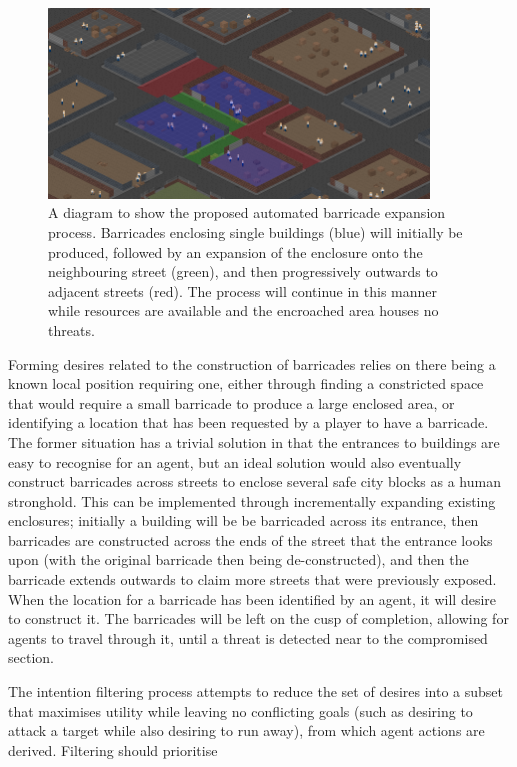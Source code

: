 \documentclass[12pt,a4paper]{article}
\begin{document}
\begin{figure}[h]
\centering
\includegraphics[width=0.9\textwidth]{barricades}
\caption{A diagram to show the proposed automated barricade expansion process. Barricades enclosing single buildings (blue) will initially be produced, followed by an expansion of the enclosure onto the neighbouring street (green), and then progressively outwards to adjacent streets (red). The process will continue in this manner while resources are available and the encroached area houses no threats.}
\label{fig:barricades}
\end{figure}

Forming desires related to the construction of barricades relies on there being a known local position requiring one, either through finding a constricted space that would require a small barricade to produce a large enclosed area, or identifying a location that has been requested by a player to have a barricade. The former situation has a trivial solution in that the entrances to buildings are easy to recognise for an agent, but an ideal solution would also eventually construct barricades across streets to enclose several safe city blocks as a human stronghold. This can be implemented through incrementally expanding existing enclosures; initially a building will be be barricaded across its entrance, then barricades are constructed across the ends of the street that the entrance looks upon (with the original barricade then being de-constructed), and then the barricade extends outwards to claim more streets that were previously exposed. When the location for a barricade has been identified by an agent, it will desire to construct it. The barricades will be left on the cusp of completion, allowing for agents to travel through it, until a threat is detected near to the compromised section.

The intention filtering process attempts to reduce the set of desires into a subset that maximises utility while leaving no conflicting goals (such as desiring to attack a target while also desiring to run away), from which agent actions are derived. Filtering should prioritise 
\end{document}
